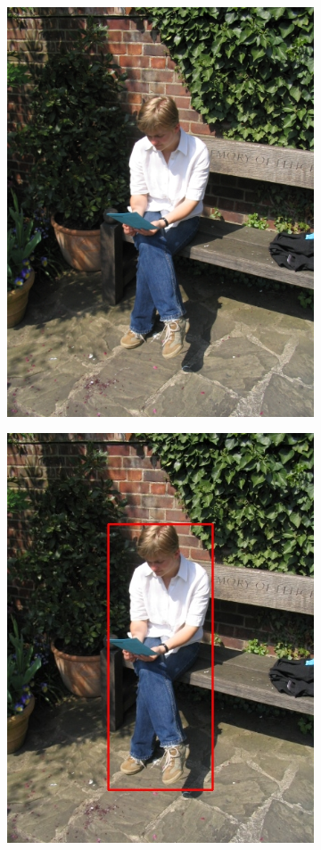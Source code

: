 \documentclass[a4paper,11]{article}
\begin{document}
\begin{center}
\begin{figure}[H]
   \begin{subfigure}{0.33\textwidth}
      \centering
      \includegraphics[width=0.9\linewidth]{images/person6}
    \end{subfigure}
    \begin{subfigure}{.33\textwidth}
      \centering
      \includegraphics[width=0.9\linewidth]{results/input/person6}

\end{subfigure}
\end{figure}
\end{center}
\end{document}
